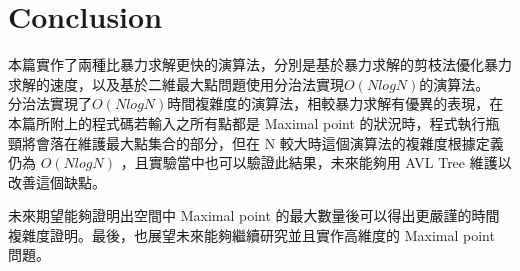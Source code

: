 \documentclass[12pt]{article}
\begin{document}
\part{Conclusion}
本篇實作了兩種比暴力求解更快的演算法，分別是基於暴力求解的剪枝法優化暴力求解的速度，以及基於二維最大點問題使用分治法實現$O(NlogN)$的演算法。\\

分治法實現了$O(NlogN)$時間複雜度的演算法，相較暴力求解有優異的表現，在本篇所附上的程式碼若輸入之所有點都是 Maximal point 的狀況時，程式執行瓶頸將會落在維護最大點集合的部分，但在 N 較大時這個演算法的複雜度根據定義仍為 $O(NlogN)$\cite{Computational_geometry}\cite{enwiki:1038770021} ，且實驗當中也可以驗證此結果，未來能夠用 AVL Tree 維護以改善這個缺點。

未來期望能夠證明出空間中 Maximal point 的最大數量後可以得出更嚴謹的時間複雜度證明。最後，也展望未來能夠繼續研究並且實作高維度的 Maximal point 問題。


\end{document}

